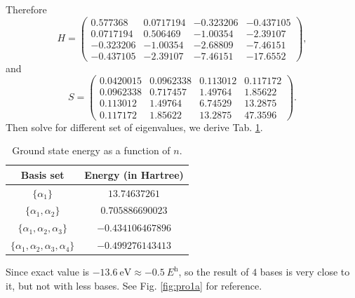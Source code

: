 \documentclass[12pt]{article}
\begin{document}
Therefore
\begin{equation}
    H =
    \begin{pmatrix}
        0.577368  & 0.0717194 & -0.323206 & -0.437105 \\
        0.0717194 & 0.506469  & -1.00354  & -2.39107  \\
        -0.323206 & -1.00354  & -2.68809  & -7.46151  \\
        -0.437105 & -2.39107  & -7.46151  & -17.6552
    \end{pmatrix},
\end{equation}
and
\begin{equation}
    S =
    \begin{pmatrix}
        0.0420015 & 0.0962338 & 0.113012 & 0.117172 \\
        0.0962338 & 0.717457  & 1.49764  & 1.85622  \\
        0.113012  & 1.49764   & 6.74529  & 13.2875  \\
        0.117172  & 1.85622   & 13.2875  & 47.3596
    \end{pmatrix}.
\end{equation}
Then solve for different set of eigenvalues, we derive Tab. \ref{tab:1-a}.
\begin{table}[h]
    \centering
    \caption{Ground state energy as a function of $n$.}
    \begin{tabular}{|c|c|}
        \hline
        Basis set                                     & Energy (in Hartree) \\
        \hline
        $\{ \alpha_1\}$                               & $13.74637261$       \\
        \hline
        $\{ \alpha_1, \alpha_2\}$                     & $0.705886690023$    \\
        \hline
        $\{ \alpha_1, \alpha_2, \alpha_3\}$           & $-0.434106467896$   \\
        \hline
        $\{ \alpha_1, \alpha_2, \alpha_3, \alpha_4\}$ & $-0.499276143413$   \\
        \hline
    \end{tabular}
    \label{tab:1-a}
\end{table}

Since exact value is $\SI{-13.6}{\electronvolt} \approx \SI{-0.5}{\hartree}$, so the result of
$4$ bases is very close to it, but not with less bases. See Fig. \ref{fig:pro1a} for reference.

\end{document}
